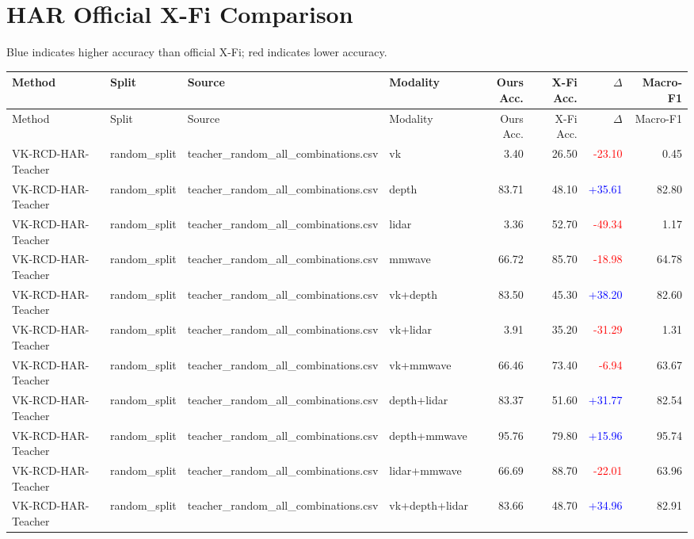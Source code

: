 \documentclass[10pt]{article}
\begin{document}
\section*{HAR Official X-Fi Comparison}
Blue indicates higher accuracy than official X-Fi; red indicates lower accuracy.
\scriptsize
\begin{longtable}{llllrrrr}
\toprule
Method & Split & Source & Modality & Ours Acc. & X-Fi Acc. & $\Delta$ & Macro-F1\\
\midrule
\endfirsthead
\toprule
Method & Split & Source & Modality & Ours Acc. & X-Fi Acc. & $\Delta$ & Macro-F1\\
\midrule
\endhead
VK-RCD-HAR-Teacher & random\_split & teacher\_random\_all\_combinations.csv & vk & 3.40 & 26.50 & \textcolor{red}{-23.10} & 0.45\\
VK-RCD-HAR-Teacher & random\_split & teacher\_random\_all\_combinations.csv & depth & 83.71 & 48.10 & \textcolor{blue}{+35.61} & 82.80\\
VK-RCD-HAR-Teacher & random\_split & teacher\_random\_all\_combinations.csv & lidar & 3.36 & 52.70 & \textcolor{red}{-49.34} & 1.17\\
VK-RCD-HAR-Teacher & random\_split & teacher\_random\_all\_combinations.csv & mmwave & 66.72 & 85.70 & \textcolor{red}{-18.98} & 64.78\\
VK-RCD-HAR-Teacher & random\_split & teacher\_random\_all\_combinations.csv & vk+depth & 83.50 & 45.30 & \textcolor{blue}{+38.20} & 82.60\\
VK-RCD-HAR-Teacher & random\_split & teacher\_random\_all\_combinations.csv & vk+lidar & 3.91 & 35.20 & \textcolor{red}{-31.29} & 1.31\\
VK-RCD-HAR-Teacher & random\_split & teacher\_random\_all\_combinations.csv & vk+mmwave & 66.46 & 73.40 & \textcolor{red}{-6.94} & 63.67\\
VK-RCD-HAR-Teacher & random\_split & teacher\_random\_all\_combinations.csv & depth+lidar & 83.37 & 51.60 & \textcolor{blue}{+31.77} & 82.54\\
VK-RCD-HAR-Teacher & random\_split & teacher\_random\_all\_combinations.csv & depth+mmwave & 95.76 & 79.80 & \textcolor{blue}{+15.96} & 95.74\\
VK-RCD-HAR-Teacher & random\_split & teacher\_random\_all\_combinations.csv & lidar+mmwave & 66.69 & 88.70 & \textcolor{red}{-22.01} & 63.96\\
VK-RCD-HAR-Teacher & random\_split & teacher\_random\_all\_combinations.csv & vk+depth+lidar & 83.66 & 48.70 & \textcolor{blue}{+34.96} & 82.91\\

\end{longtable}
\end{document}
